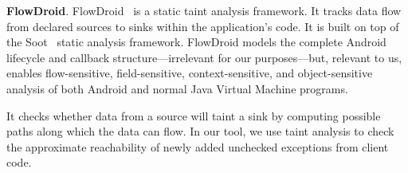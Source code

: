 \textbf{FlowDroid}. FlowDroid~\cite{Arzt14:_flowdroid} is a static taint analysis framework. It tracks data flow from declared sources to sinks within the application's code. It is built on top of the Soot~\cite{vallee2010soot} static analysis framework. FlowDroid models the complete Android lifecycle and callback structure---irrelevant for our purposes---but, relevant to us, enables flow-sensitive, field-sensitive, context-sensitive, and object-sensitive analysis of both Android and normal Java Virtual Machine programs.

It checks whether data from a source will taint a sink by computing possible paths along which the data can flow. In our tool, we use taint analysis to check the approximate reachability of newly added unchecked exceptions from client code.
